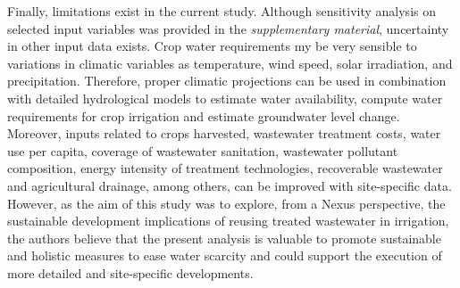 Finally, limitations exist in the current study. Although sensitivity analysis on selected input variables was provided in the \textit{supplementary material}, uncertainty in other input data exists. Crop water requirements my be very sensible to variations in climatic variables as temperature, wind speed, solar irradiation, and precipitation. Therefore, proper climatic projections can be used in combination with detailed hydrological models to estimate water availability, compute water requirements for crop irrigation and estimate groundwater level change. Moreover, inputs related to crops harvested, wastewater treatment costs, water use per capita, coverage of wastewater sanitation, wastewater pollutant composition, energy intensity of treatment technologies, recoverable wastewater and agricultural drainage, among others, can be improved with site-specific data. However, as the aim of this study was to explore, from a Nexus perspective, the  sustainable development implications of reusing treated wastewater in irrigation, the authors believe that the present analysis is valuable to promote sustainable and holistic measures to ease water scarcity and could support the execution of more detailed and site-specific developments.